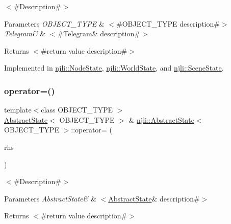 $<$\#\+Description\#$>$


\begin{DoxyParams}{Parameters}
{\em O\+B\+J\+E\+C\+T\+\_\+\+T\+Y\+PE} & $<$\#\+O\+B\+J\+E\+C\+T\+\_\+\+T\+Y\+PE description\#$>$ \\
\hline
{\em Telegram\&} & $<$\#\+Telegram\& description\#$>$\\
\hline
\end{DoxyParams}
\begin{DoxyReturn}{Returns}
$<$\#return value description\#$>$ 
\end{DoxyReturn}


Implemented in \mbox{\hyperlink{classnjli_1_1_node_state_aa05ae9e51e4a9c5061dbf6815e1a6b27}{njli\+::\+Node\+State}}, \mbox{\hyperlink{classnjli_1_1_world_state_a945df2e0dac944feb4023987b9bbe874}{njli\+::\+World\+State}}, and \mbox{\hyperlink{classnjli_1_1_scene_state_add899a791145ac1a06ee1f54d0b60196}{njli\+::\+Scene\+State}}.

\mbox{\label{classnjli_1_1_abstract_state_a70a074e9ffcc4ad76236052a4f079dc6}} 
\subsubsection{\texorpdfstring{operator=()}{operator=()}}
{\footnotesize\ttfamily template$<$class O\+B\+J\+E\+C\+T\+\_\+\+T\+Y\+PE $>$ \\
\mbox{\hyperlink{classnjli_1_1_abstract_state}{Abstract\+State}}$<$ O\+B\+J\+E\+C\+T\+\_\+\+T\+Y\+PE $>$ \& \mbox{\hyperlink{classnjli_1_1_abstract_state}{njli\+::\+Abstract\+State}}$<$ O\+B\+J\+E\+C\+T\+\_\+\+T\+Y\+PE $>$\+::operator= (\begin{DoxyParamCaption}\item[{const \mbox{\hyperlink{classnjli_1_1_abstract_state}{Abstract\+State}}$<$ O\+B\+J\+E\+C\+T\+\_\+\+T\+Y\+PE $>$ \&}]{rhs }\end{DoxyParamCaption})}

$<$\#\+Description\#$>$


\begin{DoxyParams}{Parameters}
{\em Abstract\+State\&} & $<$\mbox{\hyperlink{classnjli_1_1_abstract_state_a22638b01fb13e4e7920071d1c3935622}{Abstract\+State}}\& description\#$>$\\
\hline
\end{DoxyParams}
\begin{DoxyReturn}{Returns}
$<$\#return value description\#$>$ 
\end{DoxyReturn}


